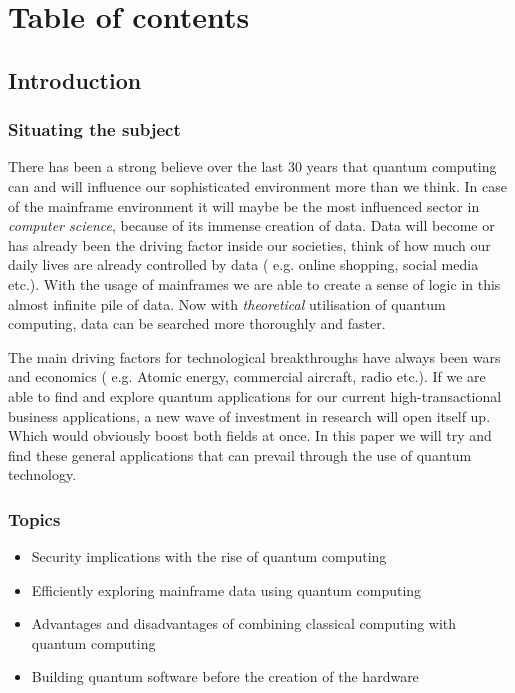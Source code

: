 \chapter{Table of contents}
\section{Introduction} %
\label{sec:introductie}
\subsection{Situating the subject}
 There has been a strong believe over the last 30 years that quantum computing can and will influence our sophisticated environment more than we think. In case of the mainframe environment it will maybe be the most influenced sector in \emph{computer science}, because of its immense creation of data. Data will become or has already been the driving factor inside our societies, think of how much our daily lives are already controlled by data ( e.g. online shopping, social media etc.). With the usage of mainframes we are able to create a sense of logic in this almost infinite pile of data. Now with \emph{ theoretical} utilisation of quantum computing, data can be searched more thoroughly and faster. \autocite{Grover1996}
 
 The main driving factors for technological breakthroughs have always been wars and economics ( e.g. Atomic energy, commercial aircraft, radio etc.). If we are able to find and explore quantum applications for our current high-transactional business applications, a new wave of investment in research will open itself up. Which would obviously boost both fields at once. In this paper we will try and find these general applications that can prevail through the use of quantum technology.

\subsection{Topics}
\begin{itemize}
  \item Security implications with the rise of quantum computing
  \item Efficiently exploring mainframe data using quantum computing
  \item Advantages and disadvantages of combining classical computing with quantum computing
  \item Building quantum software before the creation of the hardware
\end{itemize}

